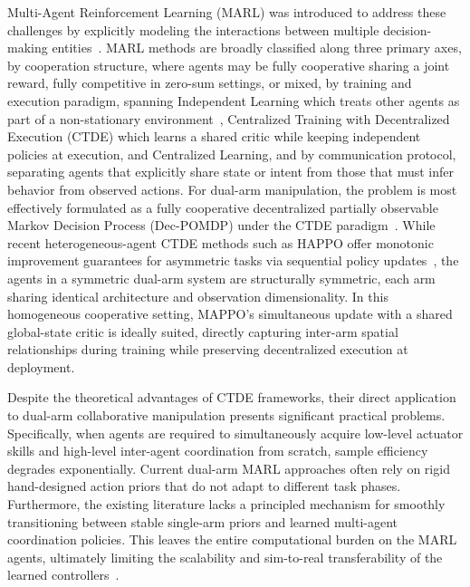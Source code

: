 Multi-Agent Reinforcement Learning (MARL) was introduced to address these challenges by explicitly
modeling the interactions between multiple decision-making
entities~\citep{albrecht2024multi,low2025cooperative}. MARL methods are broadly classified along three primary axes, by cooperation structure, where
agents may be fully cooperative sharing a joint reward, fully competitive in zero-sum settings, or
mixed, by training and execution paradigm, spanning Independent Learning which treats other agents
as part of a non-stationary environment~\citep{dewitt2020independent}, Centralized Training with
Decentralized Execution (CTDE) which learns a shared critic while keeping independent policies at
execution, and Centralized Learning, and by communication protocol, separating agents that
explicitly share state or intent from those that must infer behavior from observed actions. For
dual-arm manipulation, the problem is most effectively formulated as a fully
cooperative decentralized partially observable Markov Decision Process (Dec-POMDP) under the CTDE
paradigm~\citep{yu2022surprising}. While recent heterogeneous-agent CTDE methods such as
HAPPO offer monotonic improvement guarantees for asymmetric tasks via sequential policy
updates~\citep{kuba2021trust}, the agents in a symmetric dual-arm system are structurally symmetric,
each arm sharing identical architecture and observation dimensionality. In this homogeneous
cooperative setting, MAPPO's simultaneous update with a shared global-state critic is ideally
suited, directly capturing inter-arm spatial relationships during training while preserving
decentralized execution at deployment.

Despite the theoretical advantages of CTDE frameworks, their direct application to dual-arm
collaborative manipulation presents significant practical problems. Specifically, when agents are
required to simultaneously acquire low-level actuator skills and high-level inter-agent coordination
from scratch, sample efficiency degrades exponentially. Current dual-arm MARL approaches often rely
on rigid hand-designed action priors that do not adapt to different task phases. Furthermore, the
existing literature lacks a principled mechanism for smoothly transitioning between stable
single-arm priors and learned multi-agent coordination policies. This leaves the entire
computational burden on the MARL agents, ultimately limiting the scalability and sim-to-real
transferability of the learned controllers~\citep{alles2022learning}.

